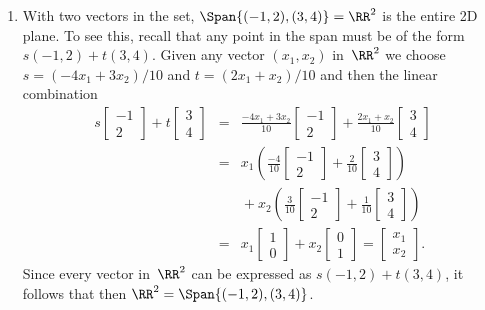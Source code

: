\begin{example}
\begin{enumerate}
\item With two vectors in the set, \(\Span\{(-1,2),(3,4)\}=\RR^2\) is the entire 2D plane.
To see this, recall that any point in the span must be of the form \(s(-1,2)+t(3,4)\).
Given any vector \((x_1,x_2)\) in~\(\RR^2\) we choose \(s=(-4x_1+3x_2)/10\) and \(t=(2x_1+x_2)/10\) and then the linear combination
\begin{eqnarray*}
s\begin{bmatrix} -1\\2 \end{bmatrix}+t\begin{bmatrix} 3\\4 \end{bmatrix}
&=&\frac{-4x_1+3x_2}{10}\begin{bmatrix} -1\\2 \end{bmatrix}+\frac{2x_1+x_2}{10}\begin{bmatrix} 3\\4 \end{bmatrix}
\\&=&x_1\left(\frac{-4}{10}\begin{bmatrix} -1\\2 \end{bmatrix}+\frac{2}{10}\begin{bmatrix} 3\\4 \end{bmatrix}\right)
\\&&{}
+x_2\left(\frac{3}{10}\begin{bmatrix} -1\\2 \end{bmatrix}+\frac{1}{10}\begin{bmatrix} 3\\4 \end{bmatrix}\right)
\\&=&x_1\begin{bmatrix} 1\\0 \end{bmatrix}
+x_2\begin{bmatrix} 0\\1 \end{bmatrix}
=\begin{bmatrix} x_1\\x_2 \end{bmatrix}.
\end{eqnarray*}
Since every vector in~\(\RR^2\) can be expressed as \(s(-1,2)+t(3,4)\), it follows that then \(\RR^2=\Span\{(-1,2),(3,4)\}\).


\end{enumerate}
\end{example}
